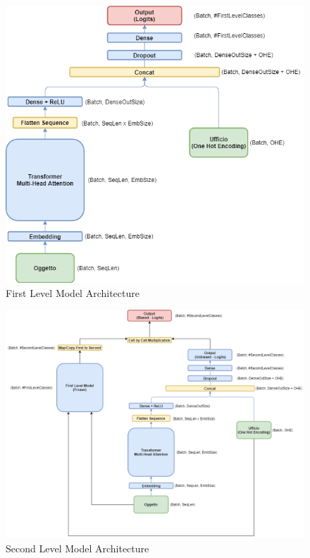 \documentclass[12pt]{article}
\begin{document}
\begin{figure}[ht!]
        \begin{adjustwidth}{0cm}{}
    	    \begin{center}
        \includegraphics[width=1\textwidth]{first_model.png}
            \end{center}
	    \end{adjustwidth}
	    \captionsetup{justification   = centering}
        \caption{First Level Model Architecture}
        \label{fig:archifirst}
\end{figure}

\begin{figure}[ht!]
        \begin{adjustwidth}{-3cm}{}
    	    \begin{center}
        \includegraphics[width=1.45\textwidth]{second_model.png}
            \end{center}
	    \end{adjustwidth}
	    \captionsetup{justification   = centering}
        \caption{Second Level Model Architecture}
        \label{fig:archisecond}
\end{figure}
\end{document}
